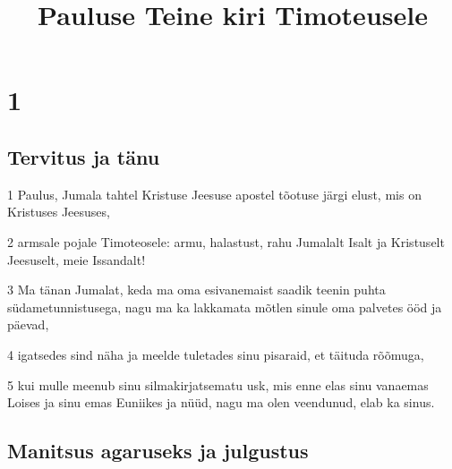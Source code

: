

\title{Pauluse Teine kiri Timoteusele}

\chapter{1}

\section*{Tervitus ja tänu}

\par 1 Paulus, Jumala tahtel Kristuse Jeesuse apostel tõotuse järgi elust, mis on Kristuses Jeesuses,
\par 2 armsale pojale Timoteosele: armu, halastust, rahu Jumalalt Isalt ja Kristuselt Jeesuselt, meie Issandalt!
\par 3 Ma tänan Jumalat, keda ma oma esivanemaist saadik teenin puhta südametunnistusega, nagu ma ka lakkamata mõtlen sinule oma palvetes ööd ja päevad,
\par 4 igatsedes sind näha ja meelde tuletades sinu pisaraid, et täituda rõõmuga,
\par 5 kui mulle meenub sinu silmakirjatsematu usk, mis enne elas sinu vanaemas Loises ja sinu emas Euniikes ja nüüd, nagu ma olen veendunud, elab ka sinus.

\section*{Manitsus agaruseks ja julgustus}

